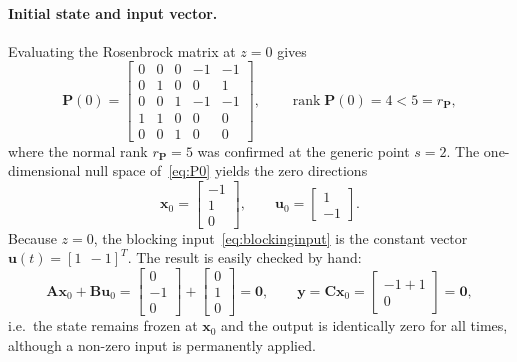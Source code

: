 \paragraph{Initial state and input vector.} Evaluating the Rosenbrock matrix at $z=0$ gives
\begin{equation}
    \mathbf{P}(0)=
    \begin{bmatrix}
        0&0&0&-1&-1\\
        0&1&0& 0& 1\\
        0&0&1&-1&-1\\
        1&1&0& 0& 0\\
        0&0&1& 0& 0
    \end{bmatrix},
    \qquad \operatorname{rank}\mathbf{P}(0)=4<5=r_{\mathbf{P}} ,
    \label{eq:P0}
\end{equation}
where the normal rank $r_{\mathbf{P}}=5$ was confirmed at the generic point $s=2$. The
one-dimensional null space of~\eqref{eq:P0} yields the zero directions
\begin{equation}
    \mathbf{x}_0 = \begin{bmatrix}-1\\ 1\\ 0\end{bmatrix},
    \qquad
    \mathbf{u}_0 = \begin{bmatrix}1\\ -1\end{bmatrix}.
    \label{eq:dir211}
\end{equation}
Because $z=0$, the blocking input~\eqref{eq:blockinginput} is the constant vector
$\mathbf{u}(t)=[1\ \ -1]^T$. The result is easily checked by hand:
\begin{equation}
    \mathbf{A}\mathbf{x}_0+\mathbf{B}\mathbf{u}_0
    = \begin{bmatrix}0\\-1\\0\end{bmatrix}+\begin{bmatrix}0\\1\\0\end{bmatrix}
    = \mathbf{0},
    \qquad
    \mathbf{y} = \mathbf{C}\mathbf{x}_0 = \begin{bmatrix}-1+1\\ 0\end{bmatrix}=\mathbf{0},
    \label{eq:check211}
\end{equation}
i.e.\ the state remains frozen at $\mathbf{x}_0$ and the output is identically zero for all
times, although a non-zero input is permanently applied.

